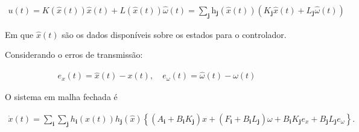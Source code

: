 \begin{gather}
  u(t)=K(\hat{x}(t)) \hat{x}(t) + L(\hat{x}(t)) \hat{\omega}(t)=\sum_{\mathbf{j}
  } \mathrm{h}_{\mathbf{j}}(\hat{x}(t)) \left( K_{\mathbf{j}} \hat{x}(t)  + L_{\mathbf{j}} \hat{\omega}(t) \right)
\end{gather}

Em que $\hat{x}(t)$ são os dados disponíveis sobre os estados para o controlador.

\vspace{0.5cm}
Considerando o erros de transmissão:

\begin{gather}
  e_x(t)=\hat{x}(t)-x(t), \quad e_\omega(t)=\hat{\omega}(t)-\omega(t)
\end{gather}

O sistema em malha fechada é

\begin{gather}
  \dot{x}(t) = \sum_{\mathbf{i}} \sum_{\mathbf{j}} h_\mathbf{i}(x(t)) h_\mathbf{j}(\hat{x}) \left\{ (A_{\mathbf{i}} + B_{\mathbf{i}}K_{\mathbf{j}})x + (F_{\mathbf{i}} + B_{\mathbf{i}}L_{\mathbf{j}})\omega + B_{\mathbf{i}}K_{\mathbf{j}}e_x + B_{\mathbf{j}}L_{\mathbf{j}}e_\omega \right\}.
\end{gather}

